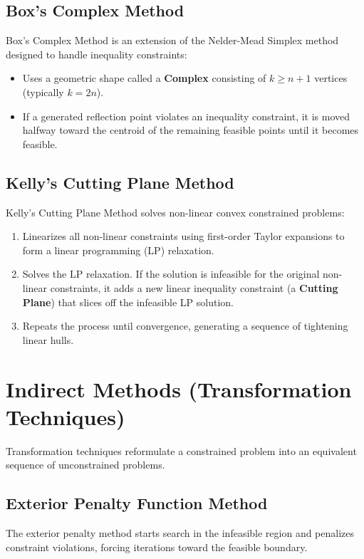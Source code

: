\documentclass[12pt,a4paper]{article}
\begin{document}
\subsection{Box's Complex Method}
Box's Complex Method is an extension of the Nelder-Mead Simplex method designed to handle inequality constraints:
\begin{itemize}[leftmargin=*, itemsep=2.5pt]
  \item Uses a geometric shape called a \textbf{Complex} consisting of $k \ge n+1$ vertices (typically $k = 2n$).
  \item If a generated reflection point violates an inequality constraint, it is moved halfway toward the centroid of the remaining feasible points until it becomes feasible.
\end{itemize}

\subsection{Kelly's Cutting Plane Method}
Kelly's Cutting Plane Method solves non-linear convex constrained problems:
\begin{enumerate}[label=\textbf{\arabic*.}, leftmargin=*, itemsep=2.5pt]
  \item Linearizes all non-linear constraints using first-order Taylor expansions to form a linear programming (LP) relaxation.
  \item Solves the LP relaxation. If the solution is infeasible for the original non-linear constraints, it adds a new linear inequality constraint (a \textbf{Cutting Plane}) that slices off the infeasible LP solution.
  \item Repeats the process until convergence, generating a sequence of tightening linear hulls.
\end{enumerate}

\section{Indirect Methods (Transformation Techniques)}

Transformation techniques reformulate a constrained problem into an equivalent sequence of unconstrained problems.

\subsection{Exterior Penalty Function Method}
The exterior penalty method starts search in the infeasible region and penalizes constraint violations, forcing iterations toward the feasible boundary.
\end{document}
